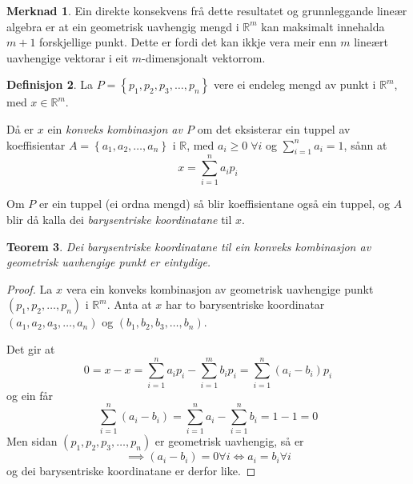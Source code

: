\documentclass[a4paper, 12pt, norsk]{article}
\theoremstyle{plain}
\newtheorem{theorem}{Teorem}[section]
\theoremstyle{definition}
\newtheorem{definition}[theorem]{Definisjon}
\newtheorem{remark}[theorem]{Merknad}
\newcommand{\Rb}{\mathbb{R}}
\newcommand{\set}[1]{ \left\{ #1 \right\} } %
\newcommand{\tuple}[1]{ \left( #1 \right) } %
\begin{document}
\begin{remark}
	Ein direkte konsekvens frå dette resultatet og grunnleggande lineær algebra er at ein geometrisk uavhengig mengd i $\Rb^m$ kan maksimalt innehalda $m+1$ forskjellige punkt. Dette er fordi det kan ikkje vera meir enn $m$ lineært uavhengige vektorar i eit $m$-dimensjonalt vektorrom.
\end{remark}

\begin{definition}
	La \( P = \set{p_1, p_2, p_3, \dots, p_n} \) vere ei endeleg mengd av punkt i \( \Rb^m \), med \( x\in\Rb^m \).

	Då er \( x \) ein \emph{konveks kombinasjon av \( P \)} om det eksisterar ein tuppel av koeffisientar \( A=\set{a_1, a_2, \dots, a_n} \) i \( \Rb \), med \( a_i \geq 0 \; \forall i \) og \( \sum_{i=1}^n a_i = 1 \), sånn at
	\[
		x=\sum_{i=1}^n a_ip_i
	\]
	
	Om $P$ er ein tuppel (ei ordna mengd) så blir koeffisientane også ein tuppel, og $A$ blir då kalla dei \emph{barysentriske koordinatane} til $x$.
\end{definition}

\begin{theorem} \label{thm:unik-barysentrisk-koordinat}
	Dei barysentriske koordinatane til ein konveks kombinasjon av geometrisk uavhengige punkt er eintydige.
\end{theorem}

\begin{proof}
	La $x$ vera ein konveks kombinasjon av geometrisk uavhengige punkt \( \tuple{p_1, p_2, \dots, p_n} \) i $\Rb^m$. Anta at $x$ har to barysentriske koordinatar $(a_1, a_2, a_3, \dots, a_n)$ og $(b_1, b_2, b_3, \dots, b_n)$. 
	
	Det gir at
	\begin{equation*}
		0 = x - x = \sum_{i=1}^n a_ip_i - \sum_{i=1}^m b_ip_i=\sum_{i=1}^n (a_i-b_i)p_i
	\end{equation*}
	og ein får
	\begin{equation*}
		\sum_{i=1}^n(a_i-b_i)=\sum_{i=1}^na_i - \sum_{i=1}^nb_i = 1 - 1 = 0
	\end{equation*}
	Men sidan $(p_1, p_2, p_3, \dots, p_n)$ er geometrisk uavhengig, så er
	\begin{equation*}
		\implies (a_i-b_i)=0\forall i \Longleftrightarrow a_i = b_i \forall i
	\end{equation*}
	og dei barysentriske koordinatane er derfor like.
\end{proof}
\end{document}
